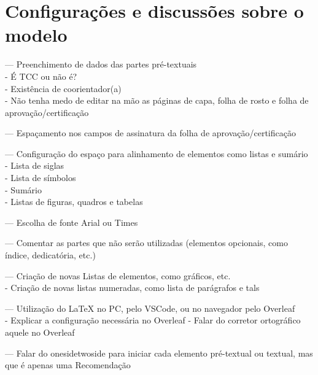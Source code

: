 \chapter{Configurações e discussões sobre o modelo}\label{capitulo:configuracao}
--- Preenchimento de dados das partes pré-textuais\\
    - É TCC ou não é?\\
    - Existência de coorientador(a)\\
    - Não tenha medo de editar na mão as páginas de capa, folha de rosto e folha de aprovação/certificação

--- Espaçamento nos campos de assinatura da folha de aprovação/certificação

--- Configuração do espaço para alinhamento de elementos como listas e sumário\\
    - Lista de siglas\\
    - Lista de símbolos\\
    - Sumário\\
    - Listas de figuras, quadros e tabelas

--- Escolha de fonte Arial ou Times

--- Comentar as partes que não serão utilizadas (elementos opcionais, como índice, dedicatória, etc.)

--- Criação de novas Listas de elementos, como gráficos, etc.\\
    - Criação de novas listas numeradas, como lista de parágrafos e tals

--- Utilização do \LaTeX{} no PC, pelo VSCode, ou no navegador pelo Overleaf\\
    - Explicar a configuração necessária no Overleaf
    - Falar do corretor ortográfico aquele no Overleaf

--- Falar do onesidetwoside para iniciar cada elemento pré-textual ou textual, mas que é apenas uma Recomendação
